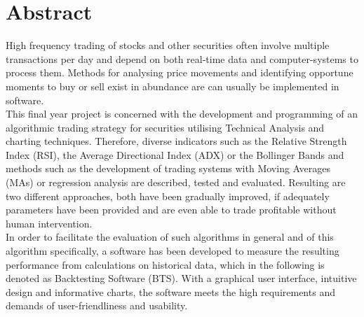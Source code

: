 \chapter*{Abstract}

High frequency trading of stocks and other securities often involve multiple transactions per day and depend on both real-time data
and computer-systems to process them.
Methods for analysing price movements and identifying opportune moments to buy or sell exist in abundance are can usually be
implemented in software.\\

This final year project is concerned with the development and programming of an algorithmic trading strategy for securities
utilising Technical Analysis and charting techniques. 
Therefore, diverse indicators such as the Relative Strength Index (RSI), the Average Directional Index (ADX) or the Bollinger Bands and methods such as the development of trading systems
with Moving Averages (MAs) or regression analysis are described, tested and evaluated. Resulting are two dif\-ferent approaches, both have been
gradually improved, if adequately parameters have been provided and are even able to trade profitable without human intervention.\\

In order to facilitate the evaluation of such algorithms in general and of this algorithm specifically, a software has been developed to
measure the resulting performance from calculations on historical data, which in the following is denoted as Backtesting Software (BTS).
With a graphical user interface, intuitive design and informative charts, the software meets the high requirements and demands of user-friendliness and usability.